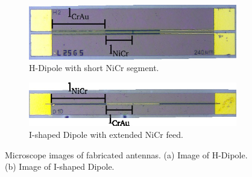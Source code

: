 \begin{figure}[!]
    \centering
    \begin{subfigure}[b]{0.45\textwidth}
        \centering
        \includegraphics[width=\textwidth]{figures/Aufnahme-154341-0001.PDF.jpg}
        \caption{\centering H-Dipole with short NiCr segment.}
        \label{fig:hdipol_real}
    \end{subfigure}
    \hfill
    \begin{subfigure}[b]{0.45\textwidth}
        \centering
        \includegraphics[width=\textwidth]{figures/Aufnahme I Dipol.jpg}
        \caption{\centering I-shaped Dipole with extended NiCr feed.}
        \label{fig:idipol_real}
    \end{subfigure}
    \caption{\centering Microscope images of fabricated antennas. (a) Image of H-Dipole. (b) Image of I-shaped Dipole.}
\end{figure}

